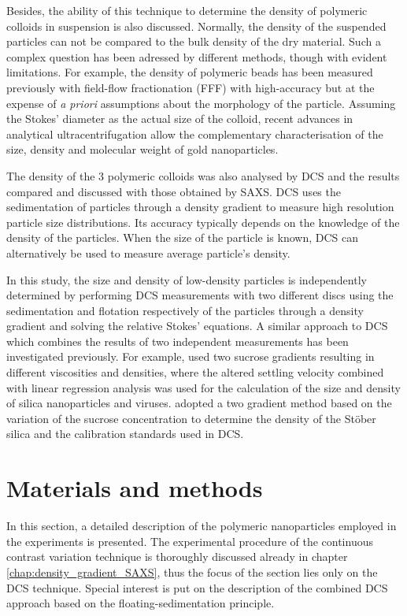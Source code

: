 Besides, the ability of this technique to determine the density of polymeric colloids in suspension is also discussed. Normally, the density of the suspended particles can not be compared to the bulk density of the dry material. Such a complex question has been adressed by different methods, though with evident limitations. For example, the density of polymeric beads has been measured previously with field-flow fractionation (FFF) with high-accuracy but at the expense of \emph{a priori} assumptions about the morphology of the particle\citep{giddings_density_1981,yang_colloid_1983,caldwell_measurement_1986}. Assuming the Stokes' diameter as the actual size of the colloid, recent advances in analytical ultracentrifugation allow the complementary characterisation of the size, density and molecular weight of gold nanoparticles\citep{carney_determination_2011}.

The density of the 3 polymeric colloids was also analysed by DCS and the results compared and discussed with those obtained by SAXS. DCS uses the sedimentation of particles through a density gradient to measure high resolution particle size distributions\citep{minelli_characterization_2014}. Its accuracy typically depends on the knowledge of the density of the particles. When the size of the particle is known, DCS can alternatively be used to measure average particle's density.

In this study, the size and density of low-density particles is independently determined by performing DCS measurements with two different discs using the sedimentation and flotation respectively of the particles through a density gradient and solving the relative Stokes' equations. A similar approach to DCS which combines the results of two independent measurements has been investigated previously. For example, \cite{neumann_new_2013} used two sucrose gradients resulting in different viscosities and densities, where the altered settling velocity combined with linear regression analysis was used for the calculation of the size and density of silica nanoparticles and viruses. \cite{bell_emerging_2012} adopted a two gradient method based on the variation of the sucrose concentration to determine the density of the St\"ober silica and the calibration standards used in DCS.

\section{Materials and methods}
In this section, a detailed description of the polymeric nanoparticles employed in the experiments is presented. The experimental procedure of the continuous contrast variation technique is thoroughly discussed already in chapter \ref{chap:density_gradient_SAXS}, thus the focus of the section lies only on the DCS technique. Special interest is put on the description of the combined DCS approach based on the floating-sedimentation principle.


